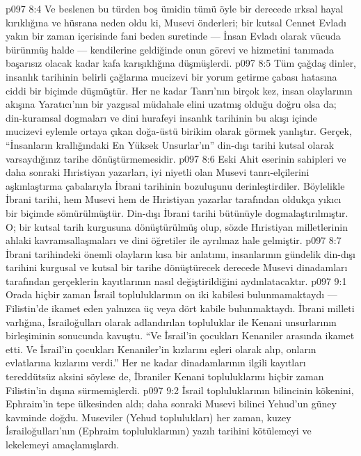 \vs p097 8:4 Ve beslenen bu türden boş ümidin tümü öyle bir derecede ırksal hayal kırıklığına ve hüsrana neden oldu ki, Musevi önderleri; bir kutsal Cennet Evladı yakın bir zaman içerisinde fani beden suretinde --- İnsan Evladı olarak vücuda bürünmüş halde --- kendilerine geldiğinde onun görevi ve hizmetini tanımada başarısız olacak kadar kafa karışıklığına düşmüşlerdi.
\vs p097 8:5 Tüm çağdaş dinler, insanlık tarihinin belirli çağlarına mucizevi bir yorum getirme çabası hatasına ciddi bir biçimde düşmüştür. Her ne kadar Tanrı’nın birçok kez, insan olaylarının akışına Yaratıcı’nın bir yazgısal müdahale elini uzatmış olduğu doğru olsa da; din\hyp{}kuramsal dogmaları ve dini hurafeyi insanlık tarihinin bu akışı içinde mucizevi eylemle ortaya çıkan doğa\hyp{}üstü birikim olarak görmek yanlıştır. Gerçek, “İnsanların krallığındaki En Yüksek Unsurlar’ın” din\hyp{}dışı tarihi kutsal olarak varsaydığınız tarihe dönüştürmemesidir.
\vs p097 8:6 Eski Ahit eserinin sahipleri ve daha sonraki Hıristiyan yazarları, iyi niyetli olan Musevi tanrı\hyp{}elçilerini aşkınlaştırma çabalarıyla İbrani tarihinin bozuluşunu derinleştirdiler. Böylelikle İbrani tarihi, hem Musevi hem de Hıristiyan yazarlar tarafından oldukça yıkıcı bir biçimde sömürülmüştür. Din\hyp{}dışı İbrani tarihi bütünüyle dogmalaştırılmıştır. O; bir kutsal tarih kurgusuna dönüştürülmüş olup, sözde Hıristiyan milletlerinin ahlaki kavramsallaşmaları ve dini öğretiler ile ayrılmaz hale gelmiştir.
\vs p097 8:7 İbrani tarihindeki önemli olayların kısa bir anlatımı, insanlarının gündelik din\hyp{}dışı tarihini kurgusal ve kutsal bir tarihe dönüştürecek derecede Musevi dinadamları tarafından gerçeklerin kayıtlarının nasıl değiştirildiğini aydınlatacaktır.
\vs p097 9:1 Orada hiçbir zaman İsrail topluluklarının on iki kabilesi bulunmamaktaydı --- Filistin’de ikamet eden yalnızca üç veya dört kabile bulunmaktaydı. İbrani milleti varlığına, İsrailoğulları olarak adlandırılan topluluklar ile Kenani unsurlarının birleşiminin sonucunda kavuştu. “Ve İsrail’in çocukları Kenaniler arasında ikamet etti. Ve İsrail’in çocukları Kenaniler’in kızlarını eşleri olarak alıp, onların evlatlarına kızlarını verdi.” Her ne kadar dinadamlarının ilgili kayıtları tereddütsüz aksini söylese de, İbraniler Kenani topluluklarını hiçbir zaman Filistin’in dışına sürmemişlerdi.
\vs p097 9:2 İsrail topluluklarının bilincinin kökenini, Ephraim’in tepe ülkesinden aldı; daha sonraki Musevi bilinci Yehud’un güney kavminde doğdu. Museviler (Yehud toplulukları) her zaman, kuzey İsrailoğulları’nın (Ephraim topluluklarının) yazılı tarihini kötülemeyi ve lekelemeyi amaçlamışlardı.
